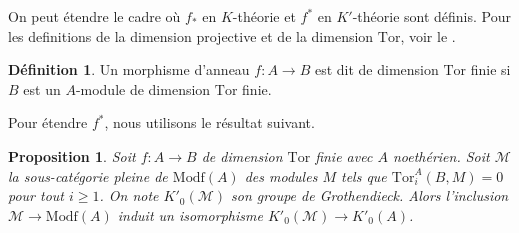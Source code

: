 \documentclass{amsart}
\theoremstyle{plain}
\newtheorem{prop}[theo]{Proposition}
\theoremstyle{definition}
\newtheorem{defi}[theo]{Définition}
\theoremstyle{remark}
\newcommand{\Modf}[1]{\mathrm{Modf}({#1})}
\newcommand{\Tor}{\mathrm{Tor}}
\newcommand{\fTor}[4]{\mathrm{Tor}_{#1}^{#2}({#3},{#4})}
\newcommand{\ra}{\rightarrow}
\begin{document}
On peut étendre le cadre où $f_*$ en $K$-théorie et $f^*$ en $K'$-théorie sont définis.
Pour les definitions de la dimension projective et de la dimension $\Tor$, voir le \cite[Chp.4]{Weib2}.

\begin{defi}
  Un morphisme d'anneau $f:A\ra B$ est dit de dimension $\Tor$ finie si $B$ est un $A$-module de dimension $\Tor$ finie.
\end{defi}

Pour étendre $f^*$, nous utilisons le résultat suivant.

\begin{prop}\label{KprimeTordimfinie}
  Soit $f:A\ra B$ de dimension $\Tor$ finie avec $A$ noethérien.
  Soit $\mathcal{M}$ la sous-catégorie pleine de $\Modf{A}$ des modules $M$ tels que $\fTor{i}{A}{B}{M}=0$ pour tout $i\geq 1$. On note $K'_0(\mathcal{M})$
  son groupe de Grothendieck. Alors l'inclusion $\mathcal{M}\ra \Modf{A}$ induit un isomorphisme $K'_0(\mathcal{M})\ra K'_0(A)$.
\end{prop}
\end{document}

